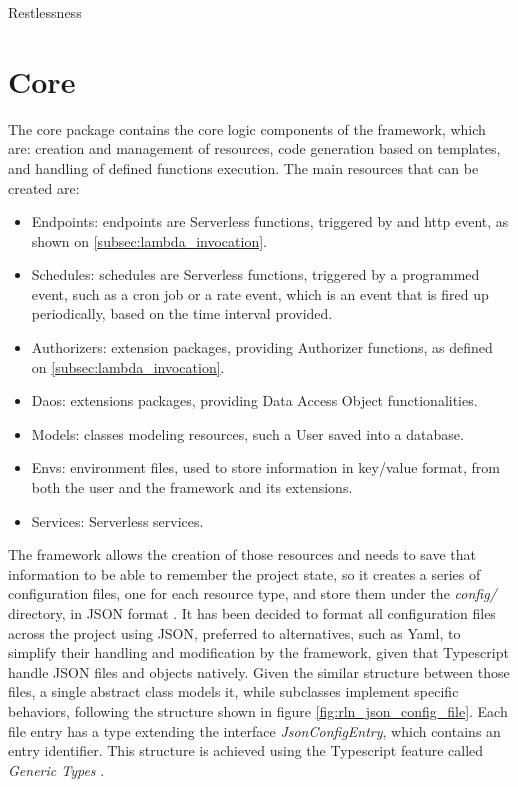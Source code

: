 \begin{chapter}{Restlessness}
    \section{Core}
    The core package contains the core logic components of the framework, which
    are: creation and management of resources, code generation based on templates,
    and handling of defined functions execution.
    The main resources that can be created are:
    \begin{itemize}
        \item Endpoints: endpoints are Serverless functions, triggered by and http
            event, as shown on \ref{subsec:lambda_invocation}.
        \item Schedules: schedules are Serverless functions, triggered by a
            programmed event, such as a cron job or a rate event, which is an
            event that is fired up periodically, based on the time interval provided.
        \item Authorizers: extension packages, providing Authorizer functions, as
            defined on \ref{subsec:lambda_invocation}.
        \item Daos: extensions packages, providing Data Access Object functionalities.
        \item Models: classes modeling resources, such a User saved into a database.
        \item Envs: environment files, used to store information in key/value format,
            from both the user and the framework and its extensions.
        \item Services: Serverless services.
    \end{itemize}

    The framework allows the creation of those resources and needs to save that
    information to be able to remember the project state, so it creates a series
    of configuration files, one for each resource type, and store them under the
    \textit{config/} directory, in JSON format \cite{json_iso}.
    It has been decided to format all configuration files across the project using JSON,
    preferred to alternatives, such as Yaml, to simplify their handling and modification
    by the framework, given that Typescript handle JSON files and objects natively.
    Given the similar structure between those files, a single abstract class models
    it, while subclasses implement specific behaviors, following the structure
    shown in figure \ref{fig:rln_json_config_file}. Each file entry has a type
    extending the interface \mbox{\textit{JsonConfigEntry}}, which contains an entry
    identifier. This structure is achieved using the Typescript feature called
    \textit{Generic Types}
    \cite{ts_generics}.


\end{chapter}
